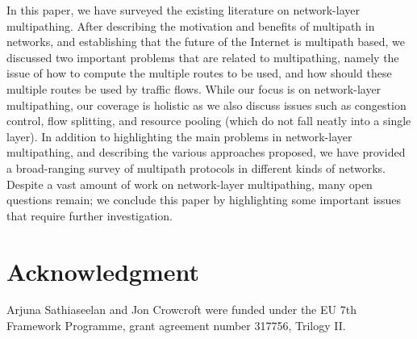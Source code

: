 \documentclass[10pt]{IEEEtran}
\begin{document}
In this paper, we have surveyed the existing literature on network-layer multipathing. After describing the motivation and benefits of multipath in networks, and establishing that the future of the Internet is multipath based, we discussed two important problems that are related to multipathing, namely the issue of how to compute the multiple routes to be used, and how should these multiple routes be used by traffic flows. While our focus is on network-layer multipathing, our coverage is holistic as we also discuss issues such as congestion control, flow splitting, and resource pooling (which do not fall neatly into a single layer). In addition to highlighting the main problems in network-layer multipathing, and describing the various approaches proposed, we have provided a broad-ranging survey of multipath protocols in different kinds of networks. Despite a vast amount of work on network-layer multipathing, many open questions remain; we conclude this paper by highlighting some important issues that require further investigation. 

\section*{Acknowledgment}

Arjuna Sathiaseelan and Jon Crowcroft were funded under the EU 7th Framework Programme, grant agreement number 317756, Trilogy II.



\end{document}
